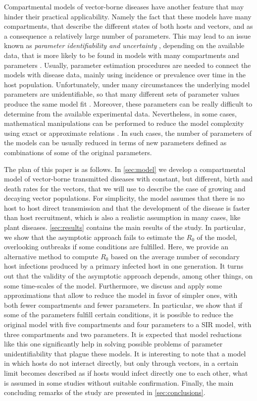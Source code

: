 Compartmental models of vector-borne diseases have another feature that may
hinder their practical applicability. Namely the fact that these models have
many compartments, that describe the different states of both hosts and
vectors, and as a consequence a relatively large number of parameters. This may
lead to an issue known as \textit{parameter identifiability and uncertainty}
\cite{Chowel2017}, depending on the available data, that is more likely to be
found in models with many compartments and parameters \cite{Roosa2019}.
Usually, parameter estimation procedures are needed to connect the models with
disease data, mainly using incidence or prevalence over time in the host
population. Unfortunately, under many circumstances the underlying model
parameters are unidentifiable, so that many different sets of parameter values
produce the same model fit \cite{Kao2018}. Moreover, these parameters can be
really difficult to determine from the available experimental data.
Nevertheless, in some cases, mathematical manipulations can be performed to
reduce the model complexity using exact or approximate relations
\cite{GimenezRomero2021}. In such cases, the number of parameters of the models
can
be usually reduced in terms of new parameters defined as combinations of some
of the original parameters.

The plan of this paper is as follows. In \cref{sec:model} we develop a
compartmental model of vector-borne transmitted diseases with constant, but
different, birth and death rates for the vectors, that we will use to describe
the case of growing and decaying vector populations. For simplicity, the model
assumes that there is no host to host direct transmission and that the
development of the disease is faster than host recruitment, which is also a
realistic assumption in  many cases, like plant diseases. \cref{sec:results}
contains the main results of the study. In particular, we show that the
asymptotic approach fails to estimate the $R_0$ of the model, overlooking
outbreaks if some conditions are fulfilled. Here, we provide an alternative
method to compute $R_0$ based on the average number of secondary host
infections produced by a primary infected host in one generation. It turns out
that the validity of the  asymptotic approach depends, among other things, on
some time-scales of the model. Furthermore, we discuss and apply some
approximations that allow to reduce the model in favor of simpler ones, with
both fewer compartments and fewer parameters. In particular, we show that if
some of the parameters fulfill certain conditions, it is possible to reduce the
original model with five compartments and four parameters to a SIR model, with
three compartments and two parameters. It is expected that model reductions
like this one significantly help in solving possible problems of parameter
unidentifiability that plague these models. It is interesting to note that a
model in which hosts do not interact directly, but only through vectors, in a
certain limit becomes described as if hosts would infect directly one to each
other, what is assumed in some studies without suitable confirmation. Finally,
the main concluding remarks of the study are presented in
\cref{sec:conclusions}.

